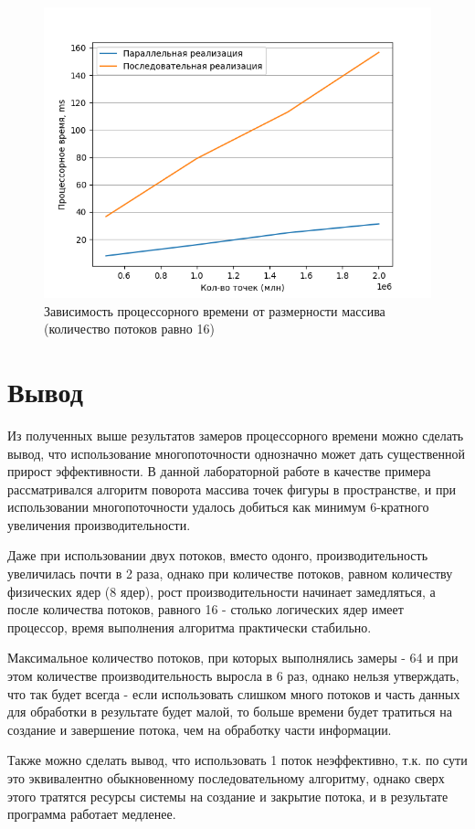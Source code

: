 \begin{figure}[!h]
	\centering
	\includegraphics[scale=0.9]{imgs/measures_2.png}
	\caption{Зависимость процессорного времени от размерности массива (количество потоков равно 16)}
	\label{img:profiling-2}
\end{figure}
\newpage


\section{Вывод}

Из полученных выше результатов замеров процессорного време­ни можно сделать вывод,
что использование многопоточности однознач­но может дать существенной прирост 
эффективности. В данной лабора­торной работе в качестве примера рассматривался 
алгоритм поворота массива точек фигуры в пространстве, и при использовании 
много­поточности удалось добиться как минимум 6-кратного увеличения про­изводительности.

Даже при использовании двух потоков, вместо одонго, производительность увеличилась почти в
2 раза, однако при количестве потоков, равном количеству физических ядер (8 ядер), рост про­изводительности
начинает замедляться, а после количества потоков, равного 16 - столько логических ядер 
имеет процессор, время выполнения алгоритма практически стабильно.

Максимальное количество потоков, при которых выполнялись за­меры - 64
и при этом количестве производительность выросла в 6 раз, 
однако нельзя утверждать, что так будет всегда - если использовать слишком 
много потоков и часть данных для обработки в результате будет малой, то больше времени
бу­дет тратиться на создание и завершение потока, чем на обработку части
информации.

Также можно сделать вывод, что использовать 1 поток неэффек­тивно, 
т.к. по сути это эквивалентно обыкновенному последовательному
алгоритму, однако сверх этого тратятся ресурсы системы на создание и
закрытие потока, и в результате программа работает медленее.